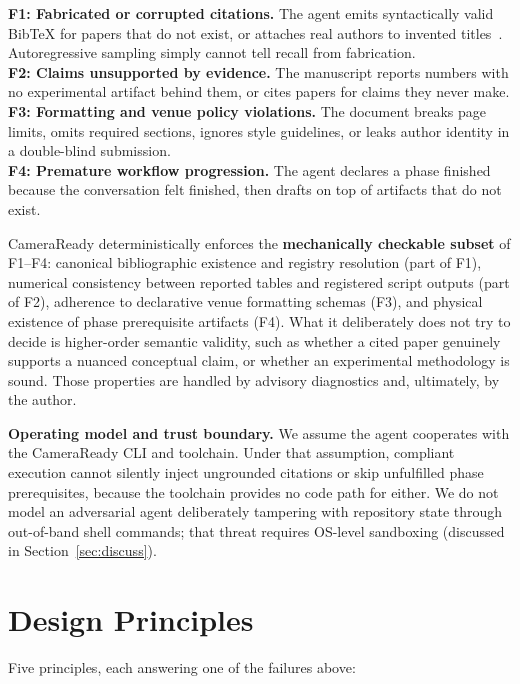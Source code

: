 \documentclass[conference]{IEEEtran}
\begin{document}
\noindent\textbf{F1: Fabricated or corrupted citations.} The agent emits syntactically valid BibTeX for papers that do not exist, or attaches real authors to invented titles~\cite{rao2026bibtex}. Autoregressive sampling simply cannot tell recall from fabrication.\\
\noindent\textbf{F2: Claims unsupported by evidence.} The manuscript reports numbers with no experimental artifact behind them, or cites papers for claims they never make.\\
\noindent\textbf{F3: Formatting and venue policy violations.} The document breaks page limits, omits required sections, ignores style guidelines, or leaks author identity in a double-blind submission.\\
\noindent\textbf{F4: Premature workflow progression.} The agent declares a phase finished because the conversation felt finished, then drafts on top of artifacts that do not exist.

CameraReady deterministically enforces the \textbf{mechanically checkable subset} of F1--F4: canonical bibliographic existence and registry resolution (part of F1), numerical consistency between reported tables and registered script outputs (part of F2), adherence to declarative venue formatting schemas (F3), and physical existence of phase prerequisite artifacts (F4). What it deliberately does not try to decide is higher-order semantic validity, such as whether a cited paper genuinely supports a nuanced conceptual claim, or whether an experimental methodology is sound. Those properties are handled by advisory diagnostics and, ultimately, by the author.

\noindent\textbf{Operating model and trust boundary.} We assume the agent cooperates with the CameraReady CLI and toolchain. Under that assumption, compliant execution cannot silently inject ungrounded citations or skip unfulfilled phase prerequisites, because the toolchain provides no code path for either. We do not model an adversarial agent deliberately tampering with repository state through out-of-band shell commands; that threat requires OS-level sandboxing (discussed in Section~\ref{sec:discuss}).

\section{Design Principles}
\label{sec:principles}

Five principles, each answering one of the failures above:
\end{document}
